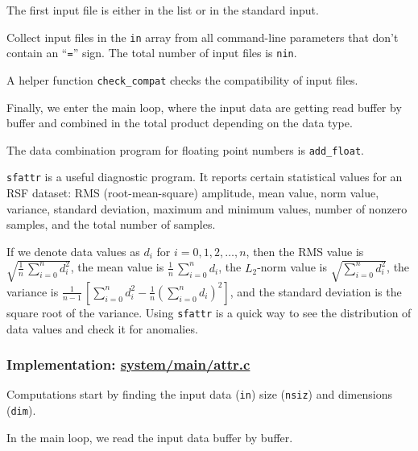 The first input file is either in the list or in the standard input.

Collect input files in the \texttt{in} array from all command-line
parameters that don't contain an ``\texttt{=}'' sign. The total number
of input files is \texttt{nin}.

A helper function \texttt{check\_compat} checks the compatibility of
input files.

Finally, we enter the main loop, where the input data are getting read
buffer by buffer and combined in the total product depending on the
data type.  

The data combination program for floating point numbers is
\texttt{add\_float}.  

\noindent\doublebox{\parbox{\textwidth}{

}}

\texttt{sfattr} is a useful diagnostic program. It reports certain
statistical values for an RSF dataset: RMS (root-mean-square)
amplitude, mean value, norm value, variance, standard deviation,
maximum and minimum values, number of nonzero samples, and the total
number of samples.

If we denote data values as $d_i$ for $i=0,1,2,\ldots,n$, then the RMS
value is $\sqrt{\frac{1}{n}\,\sum\limits_{i=0}^n d_i^2}$, the mean
value is $\frac{1}{n}\,\sum\limits_{i=0}^n d_i$, the $L_2$-norm value
is $\sqrt{\sum\limits_{i=0}^n d_i^2}$, the variance is
$\frac{1}{n-1}\,\left[\sum\limits_{i=0}^n d_i^2 - \frac{1}{n}\left(\sum\limits_{i=0}^n d_i\right)^2\right]$, and the standard
deviation is the square root of the variance. Using \texttt{sfattr}
is a quick way to see the distribution of data values and check it for
anomalies.

\subsubsection{Implementation: \href{http://rsf.svn.sourceforge.net/viewvc/rsf/trunk/system/main/attr.c?view=markup}{system/main/attr.c}}

Computations start by finding the input data (\texttt{in}) size
(\texttt{nsiz}) and dimensions (\texttt{dim}).

In the main loop, we read the input data buffer by buffer.


